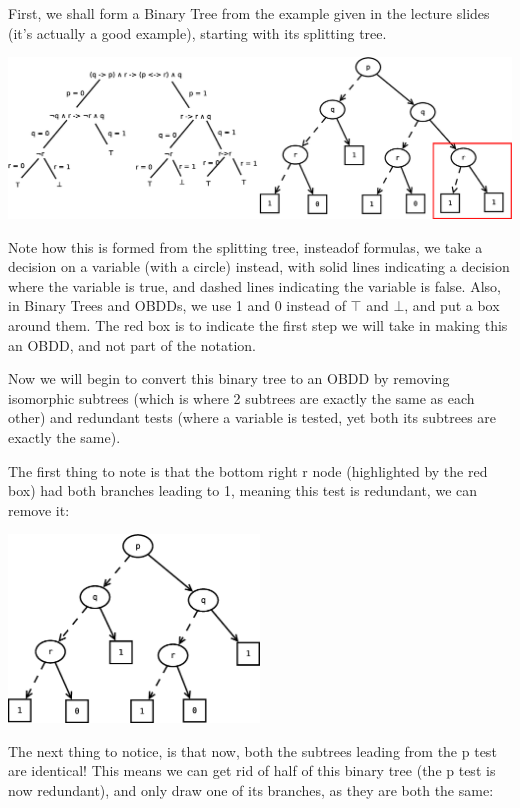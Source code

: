 \documentclass[11pt,a4paper]{article}
\begin{document}
First, we shall form a Binary Tree from the example given in the lecture slides (it's actually a good example), starting with its splitting tree.

\centerline{\includegraphics[width=1.25\textwidth]{SplittingToBinaryTree.eps}}

Note how this is formed from the splitting tree, insteadof formulas, we take a decision on a variable (with a circle) instead, with solid lines indicating a decision where the variable is true, and dashed lines indicating the variable is false. Also, in Binary Trees and OBDDs, we use 1 and 0 instead of $\top$ and $\bot$, and put a box around them. The red box is to indicate the first step we will take in making this an OBDD, and not part of the notation.

Now we will begin to convert this binary tree to an OBDD by removing isomorphic subtrees (which is where 2 subtrees are exactly the same as each other) and redundant tests (where a variable is tested, yet both its subtrees are exactly the same).

The first thing to note is that the bottom right r node (highlighted by the red box) had both branches leading to 1, meaning this test is redundant, we can remove it:

\centerline{\includegraphics[width=0.5\textwidth]{OBDDForming1.eps}}

The next thing to notice, is that now, both the subtrees leading from the p test are identical! This means we can get rid of half of this binary tree (the p test is now redundant), and only draw one of its branches, as they are both the same:
\end{document}
